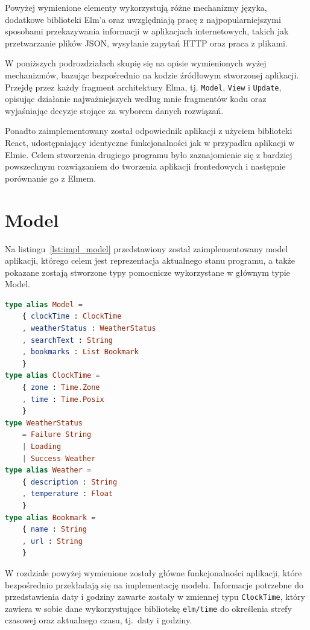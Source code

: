\documentclass[twoside,a4paper]{report}
\begin{document}
Powyżej wymienione elementy wykorzystują różne mechanizmy języka, dodatkowe biblioteki Elm'a oraz uwzględniają pracę z najpopularniejszymi sposobami przekazywania informacji w aplikacjach internetowych, takich jak przetwarzanie plików JSON, wysyłanie zapytań HTTP oraz praca z plikami.

W poniższych podrozdziałach skupię się na opisie wymienionych wyżej mechanizmów, bazując bezpośrednio na kodzie źródłowym stworzonej aplikacji.
Przejdę przez każdy fragment architektury Elma, tj. \texttt{Model}, \texttt{View} i \texttt{Update}, opisując działanie najważniejszych według mnie fragmentów kodu oraz wyjaśniając decyzje stojące za wyborem danych rozwiązań.

Ponadto zaimplementowany został odpowiednik aplikacji z użyciem biblioteki React, udostępniający identyczne funkcjonalności jak w przypadku aplikacji w Elmie.
Celem stworzenia drugiego programu było zaznajomienie się z bardziej powszechnym rozwiązaniem do tworzenia aplikacji frontedowych i następnie porównanie go z Elmem.

\section{Model}
Na listingu~\ref{lst:impl_model} przedstawiony został zaimplementowany model aplikacji, którego celem jest reprezentacja aktualnego stanu programu, a także pokazane zostają stworzone typy pomocnicze wykorzystane w głównym typie Model.

\begin{lstlisting}[caption={\textit{}Pełen model aplikacji},label={lst:impl_model},language={Elm}]
type alias Model =
    { clockTime : ClockTime
    , weatherStatus : WeatherStatus
    , searchText : String
    , bookmarks : List Bookmark
    }
type alias ClockTime =
    { zone : Time.Zone
    , time : Time.Posix
    }
type WeatherStatus
    = Failure String
    | Loading
    | Success Weather
type alias Weather =
    { description : String
    , temperature : Float
    }
type alias Bookmark =
    { name : String
    , url : String
    }
\end{lstlisting}

W rozdziale powyżej wymienione zostały główne funkcjonalności aplikacji, które bezpośrednio przekładają się na implementację modelu.
Informacje potrzebne do przedstawienia daty i godziny zawarte zostały w zmiennej typu \texttt{ClockTime}, który zawiera w sobie dane wykorzystujące bibliotekę \texttt{elm/time} do określenia strefy czasowej oraz aktualnego czasu, tj.~daty i godziny.
\end{document}
